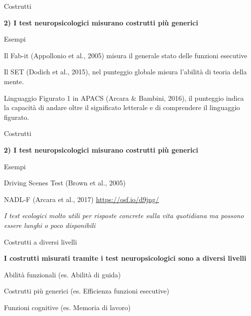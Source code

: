 \documentclass[
  ignorenonframetext,
  aspectratio=169,
]{beamer}
\begin{document}
\begin{frame}{Costrutti}
\label{costrutti-3}
\begin{center}
  \textbf{2) I test neuropsicologici misurano costrutti più generici}
\end{center}
\vspace{2em}

Esempi

Il Fab-it (Appollonio et al., 2005) misura il generale stato delle
funzioni esecutive

Il SET (Dodich et al., 2015), nel punteggio globale misura l'abilità di
teoria della mente.

Linguaggio Figurato 1 in APACS (Arcara \& Bambini, 2016), il punteggio
indica la capacità di andare oltre il significato letterale e di
comprendere il linguaggio figurato.
\end{frame}

\begin{frame}{Costrutti}
\label{costrutti-4}
\begin{center}
  \textbf{2) I test neuropsicologici misurano costrutti più generici}
\end{center}
\vspace{2em}

Esempi

Driving Scenes Test (Brown et al., 2005)

NADL-F (Arcara et al., 2017)
\href{https://osf.io/d9jng/}{\ul{https://osf.io/d9jng/}} \vspace{2em}

\emph{I test ecologici molto utili per risposte concrete sulla vita
quotidiana ma possono essere lunghi o poco disponibili}
\end{frame}

\begin{frame}{Costrutti a diversi livelli}
\label{costrutti-a-diversi-livelli}
\begin{center}
  \textbf{I costrutti misurati tramite i test neuropsicologici sono a diversi livelli}
  \vspace{2em}

  Abilità funzionali
  (es. Abilità di guida) 
  
  {\small Costrutti più generici
  (es. Efficienza funzioni esecutive)}
  
  {\footnotesize Funzioni cognitive
  (es. Memoria di lavoro)}
  
\end{center}
\end{frame}
\end{document}
